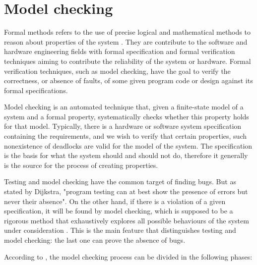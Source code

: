 \section{Model checking}
\label{sec-modelcheck}

Formal methods refers to the use of precise logical and mathematical methods to reason about properties of the system \cite{Eriksson}. They are contribute to the software and hardware engineering fields with formal specification and formal verification techniques aiming to contribute the reliability of the system or hardware. Formal verification techniques, such as model checking, have the goal to verify the correctness, or absence of faults, of some given program code or design against its formal specifications\cite{Tian}.

Model checking is an automated technique that, given a finite-state model of a system and a formal property, systematically checks whether this property holds for that model\cite{Baier}. Typically, there is a hardware or software system specification containing the requirements, and we wish to verify that certain properties, such nonexistence of deadlocks are valid for the model of the system. The specification is the basis for what the system should and should not do, therefore it generally is the source for the process of creating properties.

Testing and model checking have the common target of finding bugs. But as stated by Dijkstra, "program testing can at best show the presence of errors but never their absence". On the other hand, if there is a violation of a given specification, it will be found by model checking, which is supposed to be a rigorous method that exhaustively explores all possible behaviours of the system under consideration \cite{testVsModelCheck}. This is the main feature that distinguishes testing and model checking: the last one can prove the absence of bugs\cite{patrice}.

According to \cite{Baier}, the model checking process can be divided in the following phases:

